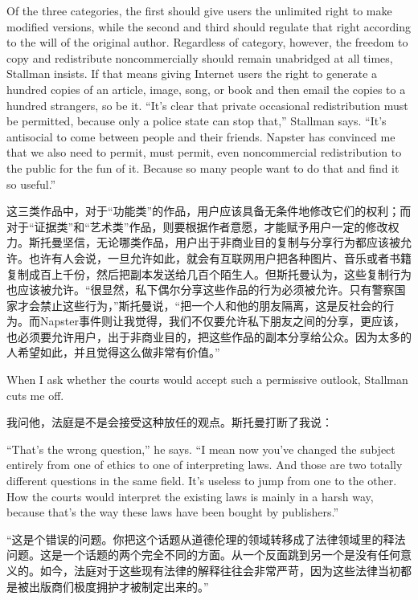\ifdefined\eng
Of the three categories, the first should give users the unlimited right to make modified versions, while the second and third should regulate that right according to the will of the original author. Regardless of category, however, the freedom to copy and redistribute noncommercially should remain unabridged at all times, Stallman insists. If that means giving Internet users the right to generate a hundred copies of an article, image, song, or book and then email the copies to a hundred strangers, so be it. ``It's clear that private occasional redistribution must be permitted, because only a police state can stop that,'' Stallman says. ``It's antisocial to come between people and their friends. Napster has convinced me that we also need to permit, must permit, even noncommercial redistribution to the public for the fun of it. Because so many people want to do that and find it so useful.''
\fi

\ifdefined\chs
这三类作品中，对于``功能类''的作品，用户应该具备无条件地修改它们的权利；而对于``证据类''和``艺术类''作品，则要根据作者意愿，才能赋予用户一定的修改权力。斯托曼坚信，无论哪类作品，用户出于非商业目的复制与分享行为都应该被允许。也许有人会说，一旦允许如此，就会有互联网用户把各种图片、音乐或者书籍复制成百上千份，然后把副本发送给几百个陌生人。但斯托曼认为，这些复制行为也应该被允许。``很显然，私下偶尔分享这些作品的行为必须被允许。只有警察国家才会禁止这些行为，''斯托曼说，``把一个人和他的朋友隔离，这是反社会的行为。而Napster事件则让我觉得，我们不仅要允许私下朋友之间的分享，更应该，也必须要允许用户，出于非商业目的，把这些作品的副本分享给公众。因为太多的人希望如此，并且觉得这么做非常有价值。''
\fi

\ifdefined\eng
When I ask whether the courts would accept such a permissive outlook, Stallman cuts me off.
\fi

\ifdefined\chs
我问他，法庭是不是会接受这种放任的观点。斯托曼打断了我说：
\fi

\ifdefined\eng
``That's the wrong question,'' he says. ``I mean now you've changed the subject entirely from one of ethics to one of interpreting laws. And those are two totally different questions in the same field. It's useless to jump from one to the other. How the courts would interpret the existing laws is mainly in a harsh way, because that's the way these laws have been bought by publishers.''
\fi

\ifdefined\chs
``这是个错误的问题。你把这个话题从道德伦理的领域转移成了法律领域里的释法问题。这是一个话题的两个完全不同的方面。从一个反面跳到另一个是没有任何意义的。如今，法庭对于这些现有法律的解释往往会非常严苛，因为这些法律当初都是被出版商们极度拥护才被制定出来的。''
\fi

